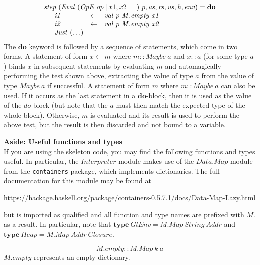 \documentclass[10pt,a4paper]{exam} %
\begin{document}
\begin{questions}
\begin{mdframed}
\begin{displaymath}
\begin{array}{l}
\mathit{step}~(\mathit{Eval}~(\mathit{OpE}~op~[\mskip1.5mu x1,x2 \mskip1.5mu]~\_)~p,\mathit{as},\mathit{rs},\mathit{us},\mathit{h},\mathit{env}) = \mathbf{do} \\
\quad \begin{array}{lcl}
\mathit{i1} & \leftarrow & \mathit{val}~p~\mathit{M.empty}~\mathit{x1} \\
\mathit{i2} & \leftarrow & \mathit{val}~p~\mathit{M.empty}~\mathit{x2} \\
\mathit{Just}~(\ldots)
\end{array}
\end{array}
\end{displaymath}
The $\mathbf{do}$ keyword is followed by a sequence of statements, which come in two forms. A statement of form $x \leftarrow m$ where $m :: \mathit{Maybe}~a$ and $x :: a$ (for some type $a$) binds $x$ in subsequent statements by evaluating $m$ and automagically performing the test shown above, extracting the value of type $a$ from the value of type $\mathit{Maybe}~a$ if successful. A statement of form $m$ where $m :: \mathit{Maybe}~a$ can also be used. If it occurs as the last statement in a $\mathbf{do}$-block, then it is used as the value of the $\mathit{do}$-block (but note that the $a$ must then match the expected type of the whole block). Otherwise, $m$ is evaluated and its result is used to perform the above test, but the result is then discarded and not bound to a variable.
\end{mdframed}

\begin{mdframed}
\textbf{Aside: Useful functions and types}\\
If you are using the skeleton code, you may find the following functions and types useful. In particular, the $\mathit{Interpreter}$ module makes use of the $\mathit{Data.Map}$ module from the \texttt{containers} package, which implements dictionaries. The full documentation for this module may be found at

\url{https://hackage.haskell.org/package/containers-0.5.7.1/docs/Data-Map-Lazy.html}

but is imported as qualified and all function and type names are prefixed with $M.$ as a result. In particular, note that $\mathbf{type}~\mathit{GlEnv} = \mathit{M.Map}~\mathit{String}~\mathit{Addr}$ and $\mathbf{type}~\mathit{Heap} = \mathit{M.Map}~\mathit{Addr}~\mathit{Closure}$.

\begin{mdframed}
\begin{displaymath}
\mathit{M.empty} :: \mathit{M.Map}~k~a
\end{displaymath}
$\mathit{M.empty}$ represents an empty dictionary.
\end{mdframed}


\end{mdframed}
\end{questions}
\end{document}
